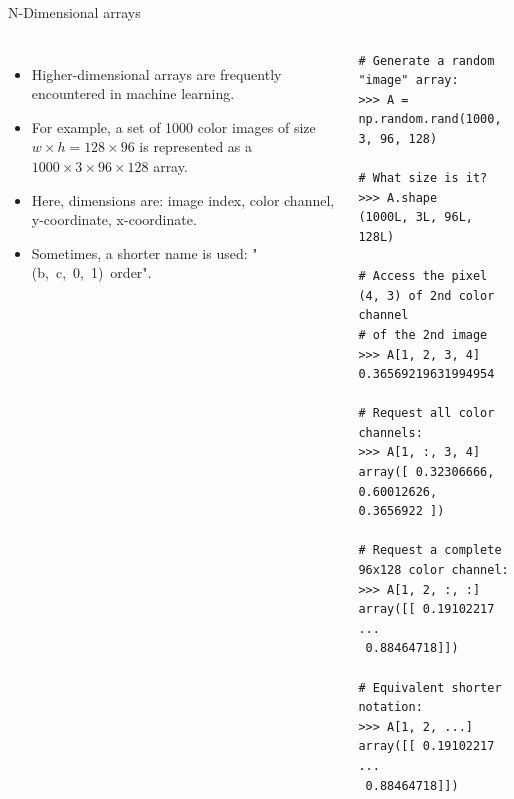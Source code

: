 \documentclass[10pt, aspectratio=169]{beamer} %
\begin{document}
\begin{frame}[fragile]
 {N-Dimensional arrays}
\begin{columns}
\begin{itemize}
\item Higher-dimensional arrays are frequently encountered in machine learning.
\item For example, a set of 1000 color images of size $w\times h = 128\times96$ is represented
as a $1000\times 3 \times 96\times 128$ array.
\item Here, dimensions are: image index, color channel, y-coordinate, x-coordinate.
\item Sometimes, a shorter name is used: \mbox{"(b, c, 0, 1) order"}.
\end{itemize}
\begin{lstlisting}
# Generate a random "image" array:
>>> A = np.random.rand(1000, 3, 96, 128)

# What size is it?
>>> A.shape
(1000L, 3L, 96L, 128L)

# Access the pixel (4, 3) of 2nd color channel 
# of the 2nd image
>>> A[1, 2, 3, 4]
0.36569219631994954

# Request all color channels:
>>> A[1, :, 3, 4]
array([ 0.32306666,  0.60012626,  0.3656922 ])

# Request a complete 96x128 color channel:
>>> A[1, 2, :, :]
array([[ 0.19102217 ...
 0.88464718]])

# Equivalent shorter notation:
>>> A[1, 2, ...]
array([[ 0.19102217 ...
 0.88464718]])
\end{lstlisting}
\end{columns}
\end{frame}
\end{document}

